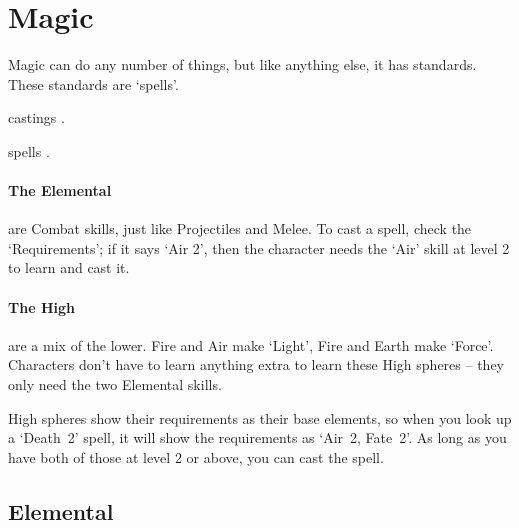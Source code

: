 \chapter[Chamber of Magic]{Magic}
\label{spellsChapter}
\toggletrue{examplecharacter}

\begin{multicols}{2}

\noindent
Magic can do any number of things, but like anything else, it has standards.
These standards are `spells'.

\Glspl{casting}
.

\Glspl{spell}
.

\subsubsection{The Elemental }
are Combat \glspl{skill}, just like Projectiles and Melee.
To cast a spell, check the `Requirements'; if it says `Air 2', then the character needs the `Air' \gls{skill} at level 2 to learn and cast it.

\subsubsection{The High }
are a mix of the lower.
Fire and Air make `Light', Fire and Earth make `Force'.
Characters don't have to learn anything extra to learn these High \glspl{sphere} -- they only need the two Elemental \glspl{skill}.

High \glspl{sphere} show their requirements as their base elements, so when you look up a `Death~2' spell, it will show the requirements as `Air~2, Fate~2'.
As long as you have both of those at level 2 or above, you can cast the spell.

\end{multicols}

\section{Elemental }

